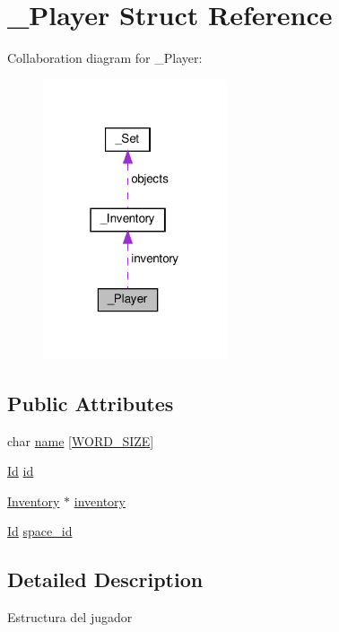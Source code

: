 \hypertarget{struct__Player}{}\section{\+\_\+\+Player Struct Reference}
\label{struct__Player}


Collaboration diagram for \+\_\+\+Player\+:\nopagebreak
\begin{figure}[H]
\begin{center}
\leavevmode
\includegraphics[width=154pt]{struct__Player__coll__graph}
\end{center}
\end{figure}
\subsection*{Public Attributes}
\begin{DoxyCompactItemize}
\item 
char \hyperlink{struct__Player_adda99df91c28eb58d392f2b43fc6898f}{name} \mbox{[}\hyperlink{types_8h_a92ed8507d1cd2331ad09275c5c4c1c89}{W\+O\+R\+D\+\_\+\+S\+I\+ZE}\mbox{]}
\item 
\hyperlink{types_8h_a845e604fb28f7e3d97549da3448149d3}{Id} \hyperlink{struct__Player_a60d635cd063816a9c1bd873f4868bb90}{id}
\item 
\hyperlink{inventory_8h_a2253bf64ac4ce6a9c1d6f39c0b0d32a3}{Inventory} $\ast$ \hyperlink{struct__Player_a5e02924cb82ca61f74ba414d190aa29b}{inventory}
\item 
\hyperlink{types_8h_a845e604fb28f7e3d97549da3448149d3}{Id} \hyperlink{struct__Player_aed09e7001b0005d679224be84e98d2a8}{space\+\_\+id}
\end{DoxyCompactItemize}


\subsection{Detailed Description}
Estructura del jugador 

